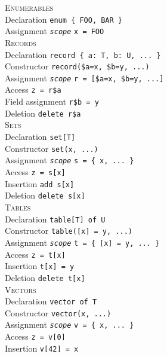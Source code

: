 \documentclass[10pt,landscape]{article}
\newcommand{\minisec}[1]{\textsc{#1}\\}
\begin{document}
\begin{multicols*}{3}
\minisec{Enumerables}
Declaration \dotfill \verb|enum { FOO, BAR }|\\
Assignment \dotfill \texttt{\textit{scope}} \verb|x = FOO|\\

\minisec{Records}
Declaration \dotfill \verb|record { a: T, b: U, ... }|\\
Constructor \dotfill \verb|record($a=x, $b=y, ...)|\\
Assignment \dotfill \texttt{\textit{scope}} \verb|r = [$a=x, $b=y, ...]|\\
Access \dotfill \verb|z = r$a|\\
Field assignment \dotfill \verb|r$b = y|\\
Deletion \dotfill \verb|delete r$a|\\

\minisec{Sets}
Declaration \dotfill \verb|set[T]|\\
Constructor \dotfill \verb|set(x, ...)|\\
Assignment \dotfill \texttt{\textit{scope}} \verb|s = { x, ... }|\\
Access \dotfill \verb|z = s[x]|\\
Insertion \dotfill \verb|add s[x]|\\
Deletion \dotfill \verb|delete s[x]|\\

\minisec{Tables}
Declaration \dotfill \verb|table[T] of U|\\
Constructor \dotfill \verb|table([x] = y, ...)|\\
Assignment \dotfill \texttt{\textit{scope}} \verb|t = { [x] = y, ... }|\\
Access \dotfill \verb|z = t[x]|\\
Insertion \dotfill \verb|t[x] = y|\\
Deletion \dotfill \verb|delete t[x]|\\

\minisec{Vectors}
Declaration \dotfill \verb|vector of T|\\
Constructor \dotfill \verb|vector(x, ...)|\\
Assignment \dotfill \texttt{\textit{scope}} \verb|v = { x, ... }|\\
Access \dotfill \verb|z = v[0]|\\
Insertion \dotfill \verb|v[42] = x|
\end{multicols*}
\end{document}
